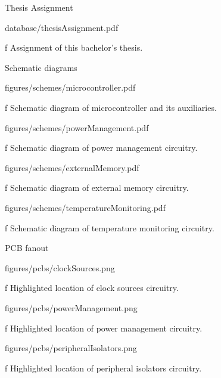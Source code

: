 

\app Thesis Assignment

\midinsert
    \hsize \cinspic database/thesisAssignment.pdf
    \caption/f Assignment of this bachelor's thesis.
\endinsert



\app Schematic diagrams

\midinsert
    \hsize \cinspic figures/schemes/microcontroller.pdf
    \caption/f Schematic diagram of microcontroller and its auxiliaries.
\endinsert

\midinsert
    \hsize \cinspic figures/schemes/powerManagement.pdf
    \caption/f Schematic diagram of power management circuitry.
\endinsert

\midinsert
    \hsize \cinspic figures/schemes/externalMemory.pdf
    \caption/f Schematic diagram of external memory circuitry.
\endinsert

\midinsert
    \hsize \cinspic figures/schemes/temperatureMonitoring.pdf
    \caption/f Schematic diagram of temperature monitoring circuitry.
\endinsert



\app PCB fanout

\midinsert
    \hsize \cinspic figures/pcbs/clockSources.png
    \caption/f Highlighted location of clock sources circuitry.
\endinsert

\midinsert
    \hsize \cinspic figures/pcbs/powerManagement.png
    \caption/f Highlighted location of power management circuitry.
\endinsert

\midinsert
    \hsize \cinspic figures/pcbs/peripheralIsolators.png
    \caption/f Highlighted location of peripheral isolators circuitry.
\endinsert




